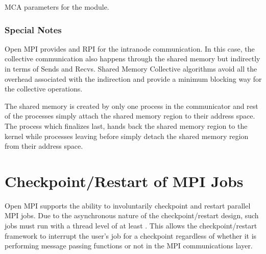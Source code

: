 \begin{table}[htbp]
  \begin{ssiparamtb}
%
%
  \end{ssiparamtb}
  \caption{MCA parameters for the   module.}
  \label{tbl:mca-ompi-shmem-mca-params}
\end{table}


\subsubsection{Special Notes}

Open MPI provides  and  RPI for the intra\-node
communication.  In this case, the collective communication also
happens through the shared memory but indirectly in terms of Sends and
Recvs.  Shared Memory Collective algorithms avoid all the overhead
associated with the indirection and provide a minimum blocking way for
the collective operations.

The shared memory is created by only one process in the communicator
and rest of the processes simply attach the shared memory region to
their address space.  The process which finalizes last, hands back the
shared memory region to the kernel while processes leaving before
simply detach the shared memory region from their address space. 




\section{Checkpoint/Restart of MPI Jobs}
\label{sec:mca-ompi-cr}

Open MPI supports the ability to involuntarily checkpoint and restart
parallel MPI jobs.  Due to the asynchronous nature of the
checkpoint/restart design, such jobs must run with a thread level of
at least .  This allows the
checkpoint/restart framework to interrupt the user's job for a
checkpoint regardless of whether it is performing message passing
functions or not in the MPI communications layer.

